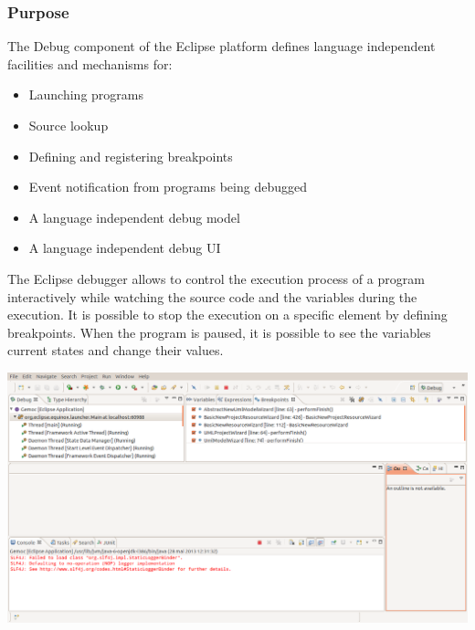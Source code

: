 \documentclass{gemoc} %
\begin{document}
\subsubsection{Purpose}
The Debug component of the Eclipse platform defines language independent facilities and mechanisms for:
\begin{itemize}
\item Launching programs
\item Source lookup
\item Defining and registering breakpoints
\item Event notification from programs being debugged
\item A language independent debug model
\item A language independent debug UI
\end{itemize}

The Eclipse debugger allows to control the execution process of a program interactively while watching the source code and the variables during the execution. It is possible to stop the execution on a specific element by defining breakpoints. When the program is paused, it is possible to see the variables current states and change their values.

\begin{center}
\includegraphics*[trim=0.0cm 0.0cm 0cm 0.0cm, clip=true, width=1.0\linewidth]{../images/EclipseDebugPerspective.png}
\end{center}
\end{document}
